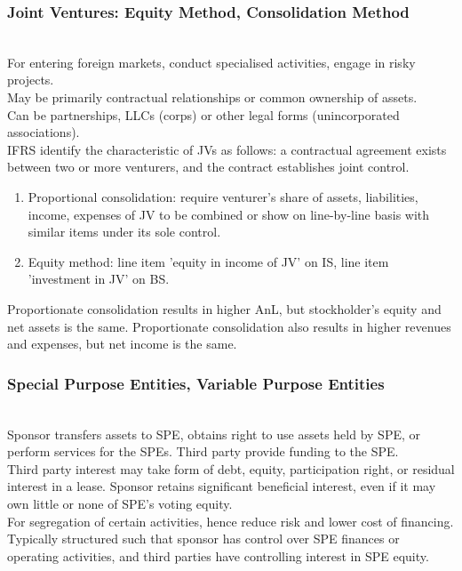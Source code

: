 \subsubsection{Joint Ventures: Equity Method, Consolidation Method}

\begin{remark} \\
For entering foreign markets, conduct specialised activities, engage in risky projects.\\
May be primarily contractual relationships or common ownership of assets.\\
Can be partnerships, LLCs (corps) or other legal forms (unincorporated associations).\\
IFRS identify the characteristic of JVs as follows: a contractual agreement exists between two or more venturers, and the contract establishes joint control.
\end{remark}

\begin{method} 
\begin{enumerate}[label=\roman*.]
\setlength{\itemsep}{0pt}
\item Proportional consolidation: require venturer’s share of assets, liabilities, income, expenses of JV to be combined or show on line-by-line basis with similar items under its sole control.
\item Equity method: line item 'equity in income of JV' on IS, line item 'investment in JV' on BS.
\end{enumerate}
Proportionate consolidation results in higher AnL, but stockholder's equity and net assets is the same. Proportionate consolidation also results in higher revenues and expenses, but net income is the same.
\end{method}

\subsubsection{Special Purpose Entities, Variable Purpose Entities}

\begin{remark} \\
Sponsor transfers assets to SPE, obtains right to use assets held by SPE, or perform services for the SPEs. Third party provide funding to the SPE.\\
Third party interest may take form of debt, equity, participation right, or residual interest in a lease. Sponsor retains significant beneficial interest, even if it may own little or none of SPE’s voting equity.\\
For segregation of certain activities, hence reduce risk and lower cost of financing.\\
Typically structured such that sponsor has control over SPE finances or operating activities, and third parties have controlling interest in SPE equity.
\end{remark}

